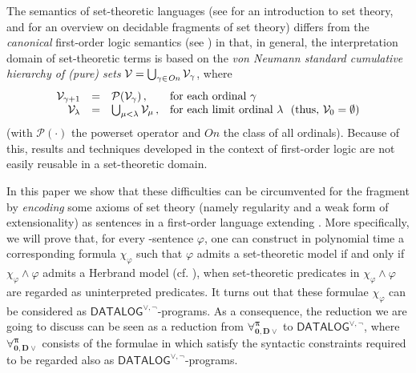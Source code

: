 \documentclass[a4paper]{llncs}
\newcommand{\DisjDatalog}{\ensuremath{\mathsf{DATALOG}^{\vee,\neg}}\xspace}
\newcommand{\ForallpizeroDisjDatalog}{\ensuremath{\mathbf{\forall_{0,D\vee}^{\pi}}}\xspace}
\begin{document}
The semantics of set-theoretic languages (see
\cite{Mos2005} for an introduction to set theory, and
\cite{CanFerOmo89a,CanOmoPol01,SchCanOmo11} for an overview on 
decidable fragments of set theory) differs from the \emph{canonical} 
first-order logic semantics (see \cite{Fitting96}) in that, in 
general, the interpretation domain of set-theoretic terms is based on 
the \emph{von Neumann standard
cumulative hierarchy of (pure) sets} $\mathcal{V} = \bigcup_{\gamma \in 
\mathit{On}} \mathcal{V}_{\gamma}$, where
\[
\begin{array}{rcll}
   \mathcal{V}_{\gamma+1} & = & \mathcal{P}(\mathcal{V}_\gamma) \,,
   & \textrm{for each ordinal $\gamma$}
\\
   \mathcal{V}_\lambda    & = & \bigcup_{\mu < \lambda} \mathcal{V}_\mu
   \,,& \textrm{for each limit ordinal $\lambda$~~(thus, $\mathcal{V}_0 = \emptyset$)}
\end{array}
\]
(with $\mathcal{P}(\cdot)$ the powerset operator and $\mathit{On}$
the class of all ordinals). Because of this, results
and techniques developed in the context of first-order logic are not 
easily reusable in a set-theoretic domain.

In this paper we show that these difficulties can be circumvented for
the fragment \Forallpizero by \emph{encoding} some axioms of set
theory (namely regularity and a weak form of extensionality) as
sentences in a first-order language extending \Forallpizero.
More specifically, we will prove that, for
every \Forallpizero-sentence $\varphi$, one can construct in polynomial
time a corresponding formula $\chi_{\varphi}$ such that
$\varphi$ admits a set-theoretic model if and only if
$\chi_{\varphi} \wedge \varphi$ admits a Herbrand model (cf.
\cite{Her2002}), when set-theoretic predicates in $\chi_{\varphi}
\wedge \varphi$ are regarded as uninterpreted predicates.
%
It turns out that these formulae $\chi_{\varphi}$ can be considered
as \DisjDatalog-programs. As a consequence, the reduction we
are going to discuss can be seen as a reduction from
\ForallpizeroDisjDatalog to \DisjDatalog, where
$\ForallpizeroDisjDatalog$
consists of the formulae in \Forallpizero which satisfy
the syntactic constraints required to be regarded also as 
\DisjDatalog-programs.
\end{document}
